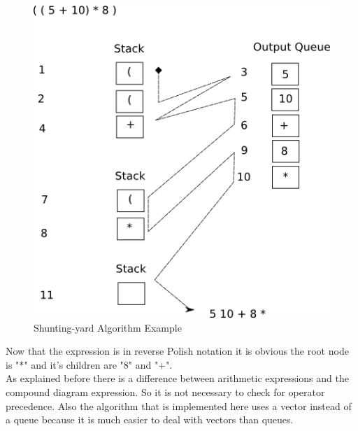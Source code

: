 \documentclass[10pt, a4paper, titlepage]{article}
\begin{document}
\begin{figure}[h]
\centering
\includegraphics[scale=0.8]{images/shunting.png}
\caption{Shunting-yard Algorithm Example}
\label{fig:shunting}
\end{figure}

Now that the expression is in reverse Polish notation it is obvious the root node is "*" and it's children are "8" and "+". \\
As explained before there is a difference between arithmetic expressions and the compound diagram expression. So it is not necessary to check for operator precedence. Also the algorithm that is implemented here uses a vector instead of a queue because it is  much easier to deal with vectors than queues.
\end{document}
